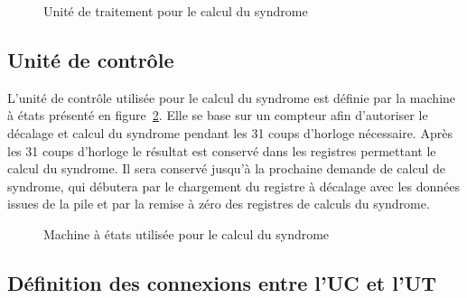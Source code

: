 \documentclass[a4paper, 11pt, svgnames]{report}
\begin{document}
\begin{figure}[H]
\begin{tikzpicture}[>=stealth,scale=0.375, every node/.style={scale=0.5}, circuit logic US]
                \end{tikzpicture}
                \caption{Unité de traitement pour le calcul du syndrome}
                \label{fig:ut_syndrome}
            \end{figure}

            \subsection{Unité de contrôle}
            \label{sec:uc_syndrome}

            L'unité de contrôle utilisée pour le calcul du syndrome est définie
            par la machine à états présenté en figure~\ref{fig:me_syndrome}.
            Elle se base sur un compteur afin d'autoriser le décalage et calcul
            du syndrome pendant les 31 coups d'horloge nécessaire. Après les 31
            coups d'horloge le résultat est conservé dans les registres
            permettant le calcul du syndrome. Il sera conservé jusqu'à la
            prochaine demande de calcul de syndrome, qui débutera par le
            chargement du registre à décalage avec les données issues de la
            pile et par la remise à zéro des registres de calculs du syndrome.

            \begin{figure}[H]
                \caption{Machine à états utilisée pour le calcul du syndrome}
                \label{fig:me_syndrome}
            \end{figure}

            \subsection{Définition des connexions entre l'UC et l'UT}
\end{document}
